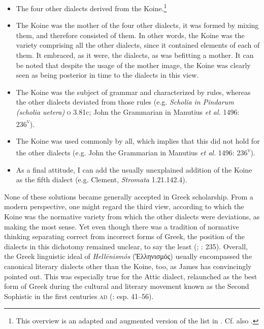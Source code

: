 \begin{itemize}
\item 
The four other dialects derived from the Koine.\footnote{This overview is an adapted and augmented version of the list in \citet[209]{VanRooy2016b}. Cf. also \citet[614--617]{Consani2000}.}

\item 
The Koine was the mother of the four other dialects, it was formed by mixing them, and therefore consisted of them. In other words, the Koine was the variety comprising all the other dialects, since it contained elements of each of them. It embraced, as it were, the dialects, as was befitting a mother. It can be noted that despite the usage of the mother image, the Koine was clearly seen as being posterior in time to the dialects in this view.

\item 
The Koine was the subject of grammar and characterized by rules, whereas the other dialects deviated from those rules (e.g. \textit{Scholia in Pindarum (scholia uetera)} \textsc{o} 3.81c; John the Grammarian in Manutius \textit{et al.} 1496: 236\textsc{\textsuperscript{v}}).

\item 
The Koine was used commonly by all, which implies that this did not hold for the other dialects (e.g. John the Grammarian in Manutius \textit{et al.} 1496: 236\textsc{\textsuperscript{v}}).

\item 
As a final attitude, I can add the usually unexplained addition of the Koine as the fifth dialect (e.g. Clement, \textit{Stromata} 1.21.142.4).

\end{itemize}

None of these solutions became generally accepted in Greek scholarship. From a modern perspective, one might regard the third view, according to which the Koine was the normative variety from which the other dialects were deviations, as making the most sense. Yet even though there was a tradition of normative thinking separating correct from incorrect forms of Greek, the position of the dialects in this dichotomy remained unclear, to say the least (\citealt{Versteegh1986}; \citealt{Dickey2007}: 235). Overall, the Greek linguistic ideal of \textit{Hellēnismós} (Ἑλληνισμός) usually encompassed the canonical literary dialects other than the Koine, too, as James \citet{Clackson2015} has convincingly pointed out. This was especially true for the Attic dialect, relaunched as the best form of Greek during the cultural and literary movement known as the Second Sophistic in the first centuries \textsc{ad} (\citealt{Whitmarsh2005}: esp. 41–56).

